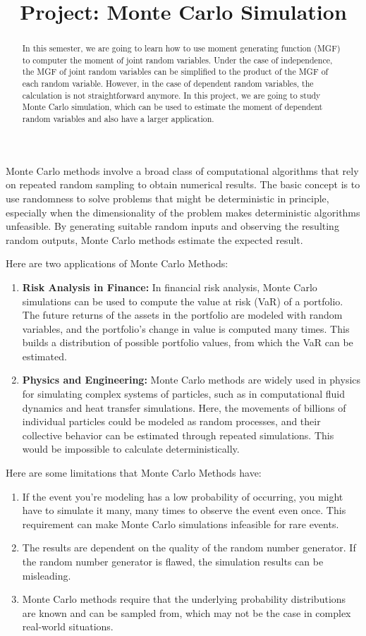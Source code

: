 \documentclass{article}
\title{Project: Monte Carlo Simulation}
\author{}
\date{}
\theoremstyle{definition}
\theoremstyle{remark}
\begin{document}
\maketitle
\begin{abstract}
    In this semester, we are going to learn how to use moment generating function (MGF) to computer the moment of joint random variables. Under the case of independence, the MGF of joint random variables can be simplified to the product of the MGF of each random variable. However, in the case of dependent random variables, the calculation is not straightforward anymore. In this project, we are going to study Monte Carlo simulation, which can be used to estimate the moment of dependent random variables and also have a larger application.
\end{abstract}

Monte Carlo methods involve a broad class of computational algorithms that rely on repeated random sampling to obtain numerical results. The basic concept is to use randomness to solve problems that might be deterministic in principle, especially when the dimensionality of the problem makes deterministic algorithms unfeasible. By generating suitable random inputs and observing the resulting random outputs, Monte Carlo methods estimate the expected result.

Here are two applications of Monte Carlo Methods:
\begin{enumerate}
    \item \textbf{Risk Analysis in Finance:} In financial risk analysis, Monte Carlo simulations can be used to compute the value at risk (VaR) of a portfolio. The future returns of the assets in the portfolio are modeled with random variables, and the portfolio's change in value is computed many times. This builds a distribution of possible portfolio values, from which the VaR can be estimated.
    \item \textbf{Physics and Engineering:} Monte Carlo methods are widely used in physics for simulating complex systems of particles, such as in computational fluid dynamics and heat transfer simulations. Here, the movements of billions of individual particles could be modeled as random processes, and their collective behavior can be estimated through repeated simulations. This would be impossible to calculate deterministically.
\end{enumerate}

Here are some limitations that Monte Carlo Methods have:
\begin{enumerate}
    \item If the event you're modeling has a low probability of occurring, you might have to simulate it many, many times to observe the event even once. This requirement can make Monte Carlo simulations infeasible for rare events.
    \item The results are dependent on the quality of the random number generator. If the random number generator is flawed, the simulation results can be misleading.
    \item Monte Carlo methods require that the underlying probability distributions are known and can be sampled from, which may not be the case in complex real-world situations.
\end{enumerate}
\end{document}
